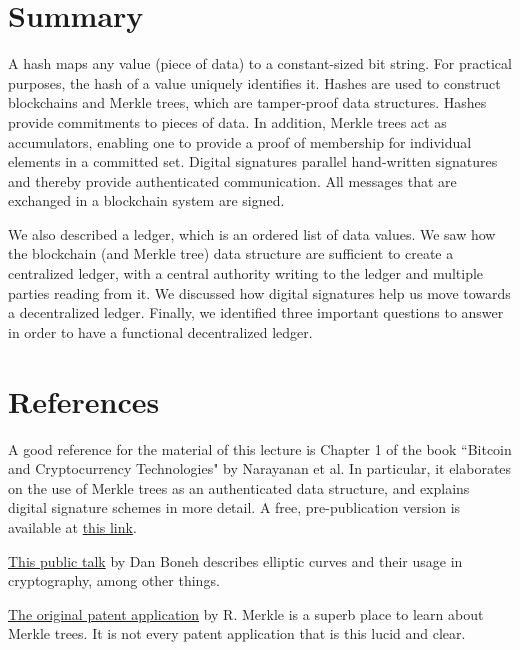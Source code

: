 \documentclass{article}
\begin{document}
\section*{Summary}
A hash maps any value (piece of data) to a constant-sized bit string. For practical purposes, the hash of a value uniquely identifies it. Hashes are used to construct blockchains and Merkle trees, which are tamper-proof data structures. Hashes provide commitments to pieces of data. In addition, Merkle trees act as accumulators, enabling one to provide a proof of membership for individual elements in a committed set. Digital signatures parallel hand-written signatures and thereby provide authenticated communication. All messages that are exchanged in a blockchain system are signed.

We also described a ledger, which is an ordered list of data values. We saw how the blockchain (and Merkle tree) data structure are sufficient to create a centralized ledger, with a central authority writing to the ledger and multiple parties reading from it. We discussed how digital signatures help us move towards a decentralized ledger. Finally, we identified three important questions to answer in order to have a functional decentralized ledger.


\section*{References}
A good reference for the material of this lecture is Chapter 1 of the book ``Bitcoin and Cryptocurrency Technologies" by Narayanan et al. In particular, it elaborates on the use of Merkle trees as an authenticated data structure, and explains digital signature schemes in more detail. A free, pre-publication version is available at  \href{https://d28rh4a8wq0iu5.cloudfront.net/bitcointech/readings/princeton_bitcoin_book.pdf}{this link}.

\href{https://www.youtube.com/watch?v=4M8_Oo7lpiA}{This public talk} by Dan Boneh describes elliptic curves and their usage in cryptography, among other things.

\href{https://patents.google.com/patent/US4309569A/en}{The original patent application} by R. Merkle is a superb place to learn about Merkle trees. It is not every patent application that is this lucid and clear. 

\end{document}
